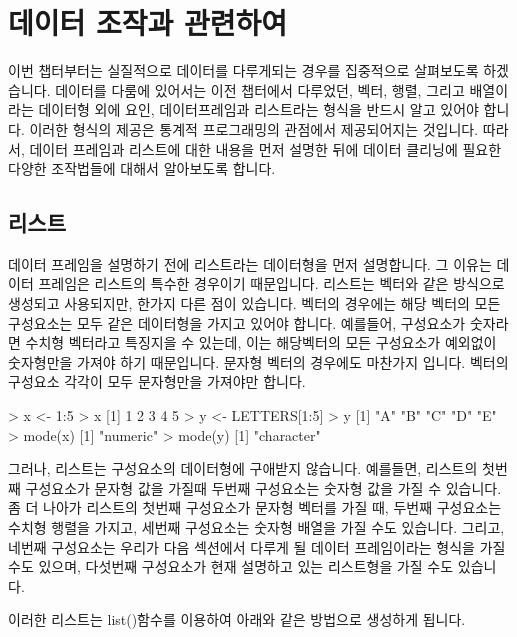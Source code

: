 %
%



\chapter{데이터 조작과 관련하여}

이번 챕터부터는 실질적으로 데이터를 다루게되는 경우를 집중적으로 살펴보도록 하겠습니다.
데이터를 다룸에 있어서는 이전 챕터에서 다루었던, 벡터, 행렬, 그리고 배열이라는 데이터형 외에 요인, 데이터프레임과 리스트라는 형식을 반드시 알고 있어야 합니다.
이러한 형식의 제공은 통계적 프로그래밍의 관점에서 제공되어지는 것입니다. 
따라서, 데이터 프레임과 리스트에 대한 내용을 먼저 설명한 뒤에 데이터 클리닝에 필요한 다양한 조작법들에 대해서 알아보도록 합니다.

\section{리스트}
데이터 프레임을 설명하기 전에 리스트라는 데이터형을 먼저 설명합니다.
그 이유는 데이터 프레임은 리스트의 특수한 경우이기 때문입니다.
리스트는 벡터와 같은 방식으로 생성되고 사용되지만, 한가지 다른 점이 있습니다.
벡터의 경우에는 해당 벡터의 모든 구성요소는 모두 같은 데이터형을 가지고 있어야 합니다.
예를들어, 구성요소가 숫자라면 수치형 벡터라고 특징지을 수 있는데, 이는 해당벡터의 모든 구성요소가 예외없이 숫자형만을 가져야 하기 때문입니다.
문자형 벡터의 경우에도 마찬가지 입니다. 
벡터의 구성요소 각각이 모두 문자형만을 가져야만 합니다.
\begin{Schunk}
\begin{Soutput}
> x <- 1:5
> x
[1] 1 2 3 4 5
> y <- LETTERS[1:5]
> y
[1] "A" "B" "C" "D" "E"
> mode(x)
[1] "numeric"
> mode(y)
[1] "character"
\end{Soutput}
\end{Schunk}

그러나, 리스트는 구성요소의 데이터형에 구애받지 않습니다.
예를들면, 리스트의 첫번째 구성요소가 문자형 값을 가질때 두번째 구성요소는 숫자형 값을 가질 수 있습니다.
좀 더 나아가 리스트의 첫번째 구성요소가 문자형 벡터를 가질 때, 두번째 구성요소는 수치형 행렬을 가지고, 세번째 구성요소는 숫자형 배열을 가질 수도 있습니다.
그리고, 네번째 구성요소는 우리가 다음 섹션에서 다루게 될 데이터 프레임이라는 형식을 가질 수도 있으며, 다섯번째 구성요소가 현재 설명하고 있는 리스트형을 가질 수도 있습니다.

이러한 리스트는 list()함수를 이용하여 아래와 같은 방법으로 생성하게 됩니다.

